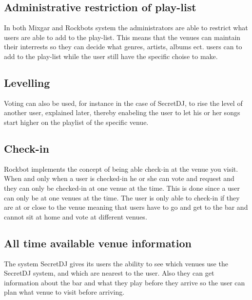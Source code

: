 \subsection{Administrative restriction of play-list}
In both Mixgar and Rockbots system the administrators are able to restrict what users are able to add to the play-list. This means that the venues can maintain their interrests so they can decide what genres, artists, albums ect. users can to add to the play-list while the user still have the specific choise to make.

\subsection{Levelling}
Voting can also be used, for instance in the case of SecretDJ, to rise the level of another user, explained later, thereby enabeling the user to let his or her songs start higher on the playlist of the specific venue.

\subsection{Check-in}
Rockbot implements the concept of being able check-in at the venue you visit. When and only when a user is checked-in he or she can vote and request and they can only be checked-in at one venue at the time. This is done since a user can only be at one venues at the time. The user is only able to check-in if they are at or close to the venue meaning that users have to go and get to the bar and cannot sit at home and vote at different venues.

\subsection{All time available venue information}
The system SecretDJ gives its users the ability to see which venues use the SecretDJ system, and which are nearest to the user. Also they can get information about the bar and what they play before they arrive so the user can plan what venue to visit before arriving.